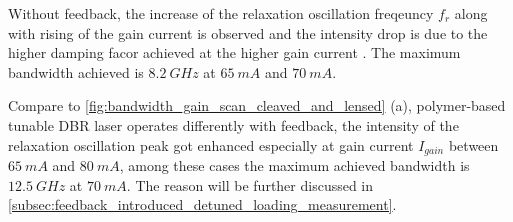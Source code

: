 Without feedback, the increase of the relaxation oscillation freqeuncy $f_r$ along with rising of the gain current is observed and the intensity drop is due to the higher damping facor achieved at the higher gain current \cite{petermann2012laser}. The maximum bandwidth achieved is $8.2 \ GHz$ at $65 \ mA$ and $70\ mA$.

Compare to \autoref{fig:bandwidth_gain_scan_cleaved_and_lensed} (a), polymer-based tunable DBR laser operates differently with feedback, the intensity of the relaxation oscillation peak got enhanced especially at gain current $I_{gain}$ between $65 \ mA$ and $80 \ mA$, among these cases the maximum achieved bandwidth is $12.5 \ GHz$ at $70 \ mA$. The reason will be further discussed in \autoref{subsec:feedback_introduced_detuned_loading_measurement}.





